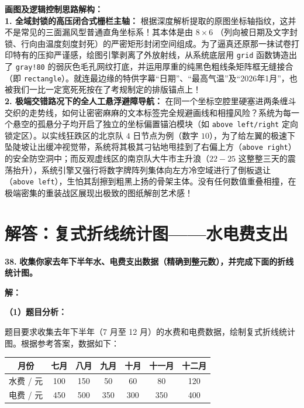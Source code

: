\documentclass[12pt, a4paper]{ctexrep}
\begin{document}
\vspace{0.4cm}
{\small\color{blue!70!black}
\textbf{画图及逻辑控制思路解构：}\\
\textbf{1. 全域封锁的高压闭合式栅栏主轴：} 根据深度解析提取的原图坐标轴指纹，这并不是常见的三面漏风型普通直角坐标系！其本体是由 $8 \times 6$ （列向被日期及文字封锁、行向由温度刻度封死）的严密矩形封闭空间组成。为了逼真还原那一抹试卷打印特有的压抑严谨感，绘图引擎剥离了外放射线，从系统底层用 \texttt{grid} 函数铸造出了 \texttt{gray!80} 的弱灰色毛孔网纹打底，并运用厚重的纯黑色粗线条矩阵框无缝接合（即 \texttt{rectangle}）。就连最边缘的特供字幕“日期”、“最高气温”及“2026年1月”，也被我们一比一定宽死死按在了考规制定的排版锚点上！\\
\textbf{2. 极端交错路况下的全人工悬浮避障导航：} 在同一个坐标空腔里硬塞进两条缠斗交织的走势线，如何让密密麻麻的文本标签完全规避画线和相撞风险？系统为每一个悬空的孤悬分子均开启了独立的坐标偏置锚泊模块（如 \texttt{above left/right} 定向锁定区）。以实线狂跌区的北京队 $4$ 日节点为例（数字 $10$），为了给左翼的极速下坠陡坡让出缓冲视觉带，系统将其极其刁钻地甩挂到了右偏上方（\texttt{above right}）的安全防空洞中；而反观虚线区的南京队大牛市主升浪（$22-25$ 这整整三天的震荡抬升），系统引擎又强行将数字牌阵列集体向左方冷空域进行了倒板退让（\texttt{above left}），生怕其刮擦到粗黑上扬的骨架主体。没有任何数值重叠相撞，在极端密集的重装战区展现出极致的图纸解剖艺术感！
}

\newpage

\section{解答：复式折线统计图——水电费支出}

\vspace{0.6cm}

\textbf{\LARGE 38.} \textbf{收集你家去年下半年水、电费支出数据（精确到整元数），并完成下面的折线统计图。}

\vspace{0.4cm}
\textbf{解：}

\textbf{（1）题目分析：}

题目要求收集去年下半年（7 月至 12 月）的水费和电费数据，绘制复式折线统计图。根据参考答案，数据如下：

\vspace{0.2cm}
\begin{center}
\renewcommand{\arraystretch}{1.5}
\begin{tabular}{c|c|c|c|c|c|c}
\toprule[1.2pt]
月份 & 七月 & 八月 & 九月 & 十月 & 十一月 & 十二月 \\
\hline
水费 / 元 & 100 & 150 & 50 & 60 & 80 & 120 \\
\hline
电费 / 元 & 450 & 500 & 350 & 300 & 350 & 400 \\
\bottomrule[1.2pt]
\end{tabular}
\end{center}
\end{document}
